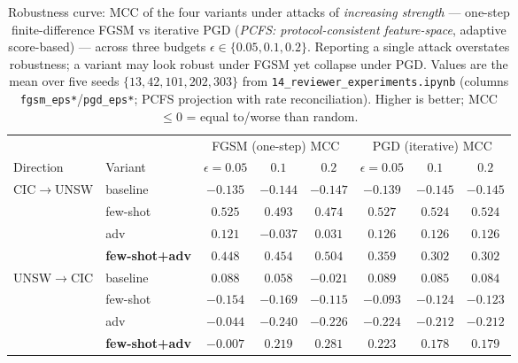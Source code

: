 \documentclass[preprint,12pt,authoryear]{elsarticle}
\begin{document}
\begin{table}[h]
\centering
\caption{Robustness curve: MCC of the four variants under attacks of \emph{increasing
strength} --- one-step finite-difference FGSM vs iterative PGD
(\emph{PCFS: protocol-consistent feature-space}, adaptive score-based) --- across three budgets
$\epsilon\in\{0.05,0.1,0.2\}$. Reporting a single attack overstates robustness; a
variant may look robust under FGSM yet collapse under PGD. Values are the mean over
five seeds $\{13,42,101,202,303\}$ from \texttt{14\_reviewer\_experiments.ipynb}
(columns \texttt{fgsm\_eps*}/\texttt{pgd\_eps*}; PCFS projection with rate
reconciliation). Higher is better; MCC $\le 0$ = equal to/worse than random.}
\label{tab:multiattack}
\small
\begin{tabular}{llcccccc}
\toprule
& & \multicolumn{3}{c}{FGSM (one-step) MCC} & \multicolumn{3}{c}{PGD (iterative) MCC} \\
\cmidrule(lr){3-5}\cmidrule(lr){6-8}
Direction & Variant & $\epsilon{=}0.05$ & $0.1$ & $0.2$ & $\epsilon{=}0.05$ & $0.1$ & $0.2$ \\
\midrule
\multirow{4}{*}{CIC$\rightarrow$UNSW}
 & baseline               & $-0.135$ & $-0.144$ & $-0.147$ & $-0.139$ & $-0.145$ & $-0.145$ \\
 & few-shot               & $0.525$ & $0.493$ & $0.474$ & $0.527$ & $0.524$ & $0.524$ \\
 & adv                    & $0.121$ & $-0.037$ & $0.031$ & $0.126$ & $0.126$ & $0.126$ \\
 & \textbf{few-shot+adv}  & $0.448$ & $0.454$ & $\mathbf{0.504}$ & $0.359$ & $0.302$ & $0.302$ \\
\midrule
\multirow{4}{*}{UNSW$\rightarrow$CIC}
 & baseline               & $0.088$ & $0.058$ & $-0.021$ & $0.089$ & $0.085$ & $0.084$ \\
 & few-shot               & $-0.154$ & $-0.169$ & $-0.115$ & $-0.093$ & $-0.124$ & $-0.123$ \\
 & adv                    & $-0.044$ & $-0.240$ & $-0.226$ & $-0.224$ & $-0.212$ & $-0.212$ \\
 & \textbf{few-shot+adv}  & $-0.007$ & $0.219$ & $\mathbf{0.281}$ & $0.223$ & $0.178$ & $0.179$ \\
\bottomrule
\end{tabular}
\end{table}
\end{document}
